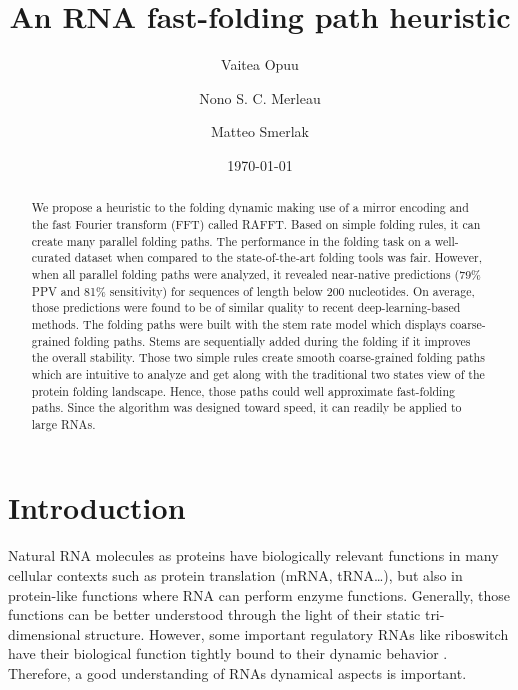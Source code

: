 \documentclass[a4paper,12pt]{article}
\author[]{Vaitea Opuu}
\author[]{Nono S. C. Merleau}
\author[]{Matteo Smerlak}
\affil[]{Max Planck Institute for Mathematics in the Sciences, Leipzig, Germany}
\date{\today}
\title{An RNA fast-folding path heuristic}
\begin{document}
\maketitle
\begin{abstract}
We propose a heuristic to the folding dynamic making use of a mirror encoding
and the fast Fourier transform (FFT) called RAFFT. Based on simple folding
rules, it can create many parallel folding paths. The performance in the folding
task on a well-curated dataset when compared to the state-of-the-art folding
tools was fair. However, when all parallel folding paths were analyzed, it
revealed near-native predictions (79\% PPV and 81\% sensitivity) for sequences of
length below 200 nucleotides. On average, those predictions were found to be of
similar quality to recent deep-learning-based methods. The folding paths were
built with the stem rate model which displays coarse-grained folding paths.
Stems are sequentially added during the folding if it improves the overall
stability. Those two simple rules create smooth coarse-grained folding paths
which are intuitive to analyze and get along with the traditional two states
view of the protein folding landscape. Hence, those paths could well approximate
fast-folding paths. Since the algorithm was designed toward speed, it can
readily be applied to large RNAs.
\end{abstract}

\section*{Introduction}
\label{sec:orgccb777f}
Natural RNA molecules as proteins have biologically relevant functions in many
cellular contexts such as protein translation (mRNA, tRNA\ldots{}), but also in
protein-like functions where RNA can perform enzyme functions. Generally, those
functions can be better understood through the light of their static
tri-dimensional structure. However, some important regulatory RNAs like
riboswitch have their biological function tightly bound to their dynamic
behavior \cite{vitreschak04_ribos}. Therefore, a good understanding of RNAs
dynamical aspects is important.
\end{document}
